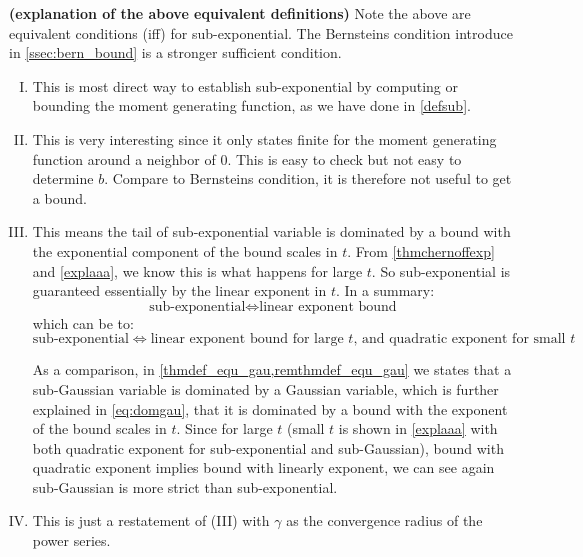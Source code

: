 \documentclass{article}
\newcommand{\bfs}[1]{\textbf{({#1})}}
\begin{document}
\begin{rema}{\bfs{explanation of the above equivalent definitions}}\label{eqexpp} Note the above are equivalent conditions (iff) for sub-exponential. The Bernsteins condition introduce in \cref{ssec:bern_bound} is a stronger sufficient condition. 
\begin{enumerate}[(I)]
    \item This is most direct way to establish sub-exponential by computing or bounding the moment generating function, as we have done in \cref{defsub}.
    \item This is very interesting since it only states finite for the moment generating function around a neighbor of  $0$. This is easy to check but not easy to determine $b$. Compare to Bernsteins condition, it is therefore not useful to get a bound.
    \item This means the tail of sub-exponential variable is dominated by a bound with the exponential component of the bound scales  in $t$. From \cref{thmchernoffexp} and \cref{explaaa}, we know this is what happens for large $t$. So sub-exponential is guaranteed essentially by the linear exponent in $t$. In a summary:
    $$\text{sub-exponential} \Longleftrightarrow \text{linear exponent bound}$$
    which can be  to:
    $$\text{sub-exponential} \Longleftrightarrow \text{linear exponent bound for large $t$, and {quadratic} exponent for small $t$}$$
  
    
    As a comparison, in \cref{thmdef_equ_gau,remthmdef_equ_gau} we states that a sub-Gaussian variable is dominated  by a Gaussian variable, which is further explained in \cref{eq:domgau}, that it is dominated by a bound with the exponent of the bound scales  in $t$. Since for large $t$ (small $t$ is shown in \cref{explaaa} with both quadratic exponent for sub-exponential and sub-Gaussian), bound with {quadratic} exponent implies bound with {linearly} exponent, we can see again sub-Gaussian is more strict than sub-exponential. 
    \item This is just a restatement of (III) with $\gamma$ as the convergence radius of the power series.
\end{enumerate}
\end{rema}
\end{document}
